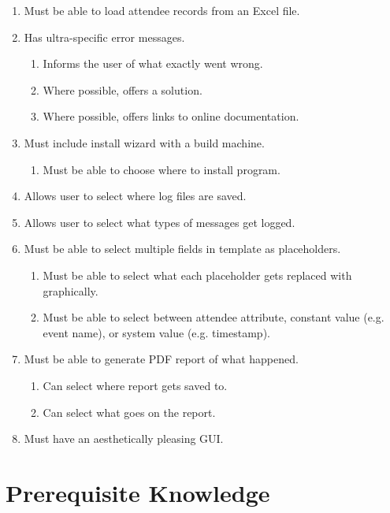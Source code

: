 \documentclass[11pt]{article}
\begin{document}
\begin{enumerate}
    \item Must be able to load attendee records from an Excel file.
    \item Has ultra-specific error messages.
    \begin{enumerate}
        \item Informs the user of what exactly went wrong.
        \item Where possible, offers a solution.
        \item Where possible, offers links to online documentation.
    \end{enumerate}
    \item Must include install wizard with a build machine.
    \begin{enumerate}
        \item Must be able to choose where to install program.
    \end{enumerate}
    \item Allows user to select where log files are saved.
    \item Allows user to select what types of messages get logged.
    \item Must be able to select multiple fields in template as placeholders.
    \begin{enumerate}
        \item Must be able to select what each placeholder gets replaced with graphically.
        \item Must be able to select between attendee attribute, constant value (e.g. event name), or system value (e.g. timestamp).
    \end{enumerate}
    \item Must be able to generate PDF report of what happened.
    \begin{enumerate}
        \item Can select where report gets saved to.
        \item Can select what goes on the report.
    \end{enumerate}
    \item Must have an aesthetically pleasing GUI.
\end{enumerate}

\newpage

\section{Prerequisite Knowledge}
\end{document}
